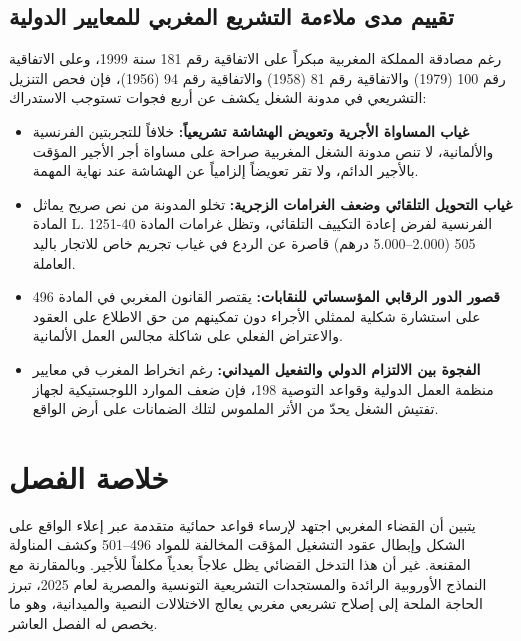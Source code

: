 \subsection{تقييم مدى ملاءمة التشريع المغربي للمعايير الدولية}
رغم مصادقة المملكة المغربية مبكراً على الاتفاقية رقم \textenglish{181} سنة \textenglish{1999}، وعلى الاتفاقية رقم \textenglish{100} (\textenglish{1979}) والاتفاقية رقم \textenglish{81} (\textenglish{1958}) والاتفاقية رقم \textenglish{94} (\textenglish{1956})، فإن فحص التنزيل التشريعي في مدونة الشغل يكشف عن أربع فجوات تستوجب الاستدراك:
\begin{itemize}[leftmargin=*, itemsep=5pt]
    \item \textbf{غياب المساواة الأجرية وتعويض الهشاشة تشريعياً:} خلافاً للتجربتين الفرنسية والألمانية، لا تنص مدونة الشغل المغربية صراحة على مساواة أجر الأجير المؤقت بالأجير الدائم، ولا تقر تعويضاً إلزامياً عن الهشاشة عند نهاية المهمة.
    \item \textbf{غياب التحويل التلقائي وضعف الغرامات الزجرية:} تخلو المدونة من نص صريح يماثل المادة \textfrench{L. 1251-40} الفرنسية لفرض إعادة التكييف التلقائي، وتظل غرامات المادة \textenglish{505} (\textenglish{2.000}--\textenglish{5.000} درهم) قاصرة عن الردع في غياب تجريم خاص للاتجار باليد العاملة.
    \item \textbf{قصور الدور الرقابي المؤسساتي للنقابات:} يقتصر القانون المغربي في المادة \textenglish{496} على استشارة شكلية لممثلي الأجراء دون تمكينهم من حق الاطلاع على العقود والاعتراض الفعلي على شاكلة مجالس العمل الألمانية.
    \item \textbf{الفجوة بين الالتزام الدولي والتفعيل الميداني:} رغم انخراط المغرب في معايير منظمة العمل الدولية وقواعد التوصية \textenglish{198}، فإن ضعف الموارد اللوجستيكية لجهاز تفتيش الشغل يحدّ من الأثر الملموس لتلك الضمانات على أرض الواقع.
\end{itemize}

\section*{خلاصة الفصل}

يتبين أن القضاء المغربي اجتهد لإرساء قواعد حمائية متقدمة عبر إعلاء الواقع على الشكل وإبطال عقود التشغيل المؤقت المخالفة للمواد \textenglish{496}--\textenglish{501} وكشف المناولة المقنعة. غير أن هذا التدخل القضائي يظل علاجاً بعدياً مكلفاً للأجير. وبالمقارنة مع النماذج الأوروبية الرائدة والمستجدات التشريعية التونسية والمصرية لعام \textenglish{2025}، تبرز الحاجة الملحة إلى إصلاح تشريعي مغربي يعالج الاختلالات النصية والميدانية، وهو ما يخصص له الفصل العاشر.
